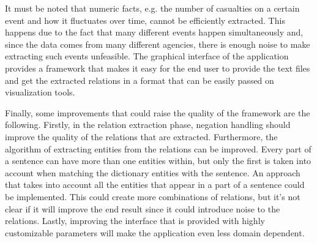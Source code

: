 \documentclass[]{article}
\begin{document}
It must be noted that numeric facts, e.g. the number of casualties on a certain event and how it fluctuates over time, cannot be efficiently extracted. This happens due to the fact that many different events happen simultaneously and, since the data comes from many different agencies, there is enough noise to make extracting such events unfeasible. The graphical interface of the application provides a framework that makes it easy for the end user to provide the text files and get the extracted relations in a format that can be easily passed on visualization tools. 

Finally, some improvements that could raise the quality of the framework are the following. Firstly, in the relation extraction phase, negation handling  should improve the quality of the relations that are extracted. Furthermore, the algorithm of extracting entities from the relations can be improved. Every part of a sentence can have more than one entities within, but only the first is taken into account when matching the dictionary entities with the sentence. An approach that takes into account all the entities that appear in a part of a sentence could be implemented. This could create more combinations of relations, but it's not clear if it will improve the end result since it could introduce noise to the relations. Lastly, improving the interface that is provided with highly customizable parameters will make the application even less domain dependent.
%
\end{document}
